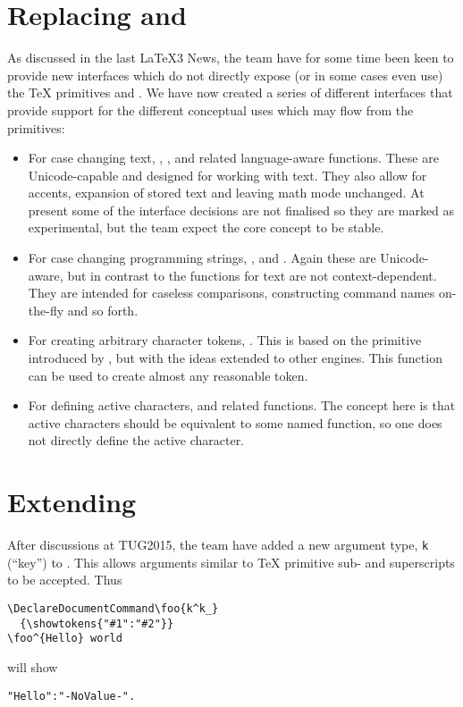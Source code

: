 \documentclass{ltnews}
\begin{document}
\section{Replacing  and }

As discussed in the last \LaTeX3 News, the team have for some time been keen to
provide new interfaces which do not directly expose (or in some cases even use)
the \TeX{} primitives  and . We have now created a
series of different interfaces that provide support for the different
conceptual uses which may flow from the primitives:
\begin{itemize}
  \item For case changing text, , ,
     and related language-aware functions. These are
    Unicode-capable and designed for working with text. They also allow for
    accents, expansion of stored text and leaving math mode unchanged.  At
    present some of the interface decisions are not finalised so they are
    marked as experimental, but the team expect the core concept to be stable.
  \item For case changing programming strings, ,
     and . Again these are
    Unicode-aware, but in contrast to the functions for text are not
    context-dependent. They are intended for caseless comparisons, constructing
    command names on-the-fly and so forth.
  \item For creating arbitrary character tokens, . This
    is based on the  primitive introduced by , but
    with the ideas extended to other engines. This function can be used to
    create almost any reasonable token.
  \item For defining active characters,  and
    related functions. The concept here is that active characters should be
    equivalent to some named function, so one does not directly define the
    active character.
\end{itemize}

\section{Extending }

After discussions at TUG2015, the team have added a new argument type,
\texttt{k} (\enquote{key}) to . This allows arguments similar to
\TeX{} primitive sub- and superscripts to be accepted. Thus
\begin{verbatim}
\DeclareDocumentCommand\foo{k^k_}
  {\showtokens{"#1":"#2"}}
\foo^{Hello} world
\end{verbatim}
will show
\begin{verbatim}
"Hello":"-NoValue-".
\end{verbatim}
\end{document}
